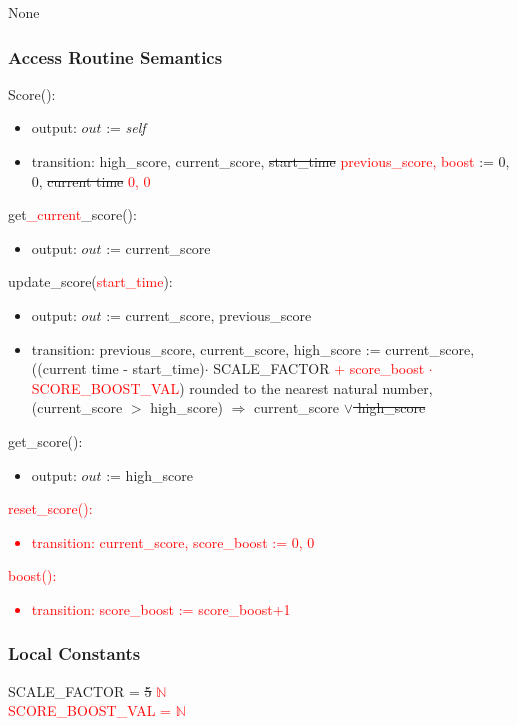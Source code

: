 \documentclass[12pt]{article}
\begin{document}
None

\subsubsection* {Access Routine Semantics}

Score():
\begin{itemize}
    \item output: $out$ := \textit{self} 
    \item transition: high\_score, current\_score, \sout{start\_time} \textcolor{red}{previous\_score, boost} := 0, 0, \sout{current time} \textcolor{red}{0, 0}
\end{itemize}
\noindent get\textcolor{red}{\_current}\_score():
\begin{itemize}
    \item output: $out$ := current\_score
\end{itemize}
\noindent update\_score(\textcolor{red}{start\_time}):
\begin{itemize}
    \item output: $out$ := current\_score, previous\_score
    \item transition: previous\_score, current\_score, high\_score := current\_score, ((current time - start\_time)$\cdot$ SCALE\_FACTOR \textcolor{red}{+ score\_boost $\cdot$ SCORE\_BOOST\_VAL}) rounded to the nearest natural number, (current\_score $>$ high\_score) $\Rightarrow$ current\_score \sout{$\lor$ high\_score}
\end{itemize}
\noindent get\_score():
\begin{itemize}
    \item output: $out$ := high\_score
\end{itemize}
\textcolor{red}{
\noindent reset\_score():
\begin{itemize}
    \item transition: current\_score, score\_boost := 0, 0
\end{itemize}
\noindent boost():
\begin{itemize}
    \item transition: score\_boost := score\_boost+1
\end{itemize}
}
\subsubsection* {Local Constants}
SCALE\_FACTOR = \sout{5} \textcolor{red}{$\mathbb{N}$} \\
\textcolor{red}{SCORE\_BOOST\_VAL = $\mathbb{N}$}
\end{document}

